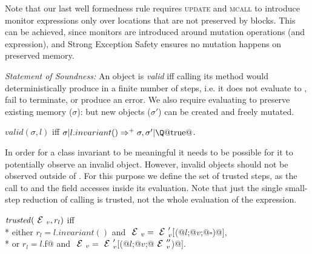 
Note that our last well formedness rule requires 
\textsc{update} and \textsc{mcall} to introduce
monitor expressions only over locations
that are not preserved by \Q@try@ blocks.
This can be achieved, since monitors are introduced
around mutation operations
(and \Q@new@ expression),
and Strong Exception Safety ensures no mutation happens on preserved memory.


\loseSpace
\noindent\textit{Statement of Soundness:}
An object is \emph{valid} iff calling its \validate{} method would
deterministically produce \Q@true@ in a finite number of steps, i.e. it does not evaluate to \Q@false@, fail to terminate, or produce an error.
We also require evaluating \validate{} to preserve existing memory ($\sigma$): but new objects ($\sigma'$) can be created and freely mutated.

\indent$valid(\sigma,l)$ iff $\sigma | l.invariant()\Rightarrow^+ \sigma,\sigma' | \text{\Q@true@}$.\loseSpace

\noindent In order for a class invariant to be meaningful it needs to be possible for it to potentially observe an invalid object. However, invalid objects should not be observed outside of \validate.
For this purpose we define the set of trusted steps, 
as the call to \validate{} and the field accesses inside its evaluation.
Note that just the single small-step reduction
of calling \validate{} is trusted, not the whole evaluation of the \validate{} expression.

\loseSpace
\noindent $\mathit{trusted}(\ctx_v,r_l)$ iff\\*
\indent either
$r_l=l.invariant()$ and
 $\ctx_v=\ctx_v'[$\Q@M(@$l$\Q@;@$v$\Q@;@$\square$\Q@)@$]$,\\*
\indent or
$r_l=l$\Q@.f@ and
 $\ctx_v=\ctx_v'[$\Q@M(@$l$\Q@;@$v$\Q@;@$\ctx_v''$\Q@)@$]$.
\loseSpace

